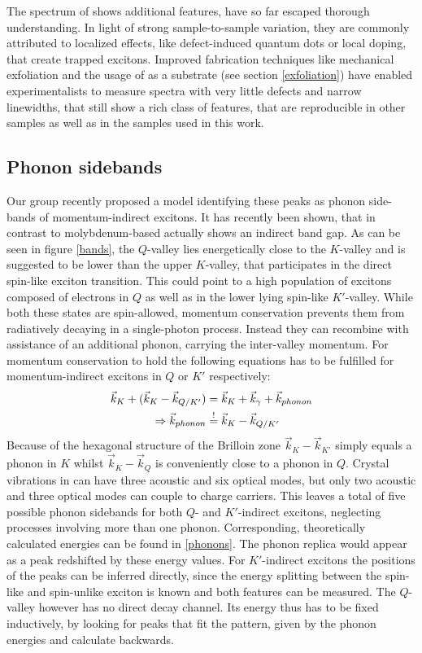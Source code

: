 The spectrum of \wse shows additional features, have so far escaped thorough understanding. In light of strong sample-to-sample variation, they are commonly attributed to localized effects, like defect-induced quantum dots or local doping\cite{kato_optical_2014, zhang_defect_2017}, that create trapped excitons. Improved fabrication techniques like mechanical exfoliation and the usage of \hbng as a substrate (see section \ref{exfoliation}) have enabled experimentalists to measure spectra with very little defects and narrow linewidths, that still show a rich class of features, that are reproducible in other samples as well as in the samples used in this work.

\subsection{Phonon sidebands}\label{sidebands}

Our group recently proposed a model identifying these peaks as phonon side-bands of momentum-indirect excitons\cite{lindlau_identifying_2017}. It has recently been shown, that in contrast to molybdenum-based \tmds \wse actually shows an indirect band gap\cite{zhang_probing_2015, hsu_evidence_2017}. As can be seen in figure \ref{bands}, the $Q$-valley lies energetically close to the $K$-valley and is suggested to be lower than the upper $K$-valley, that participates in the direct spin-like exciton transition. This could point to a high population of excitons composed of electrons in $Q$ as well as in the lower lying spin-like $K'$-valley. While both these states are spin-allowed, momentum conservation prevents them from radiatively decaying in a single-photon process. Instead they can recombine with assistance of an additional phonon, carrying the inter-valley momentum. For momentum conservation to hold the following equations has to be fulfilled for momentum-indirect excitons in $Q$ or $K'$ respectively:
\begin{align}
	\vec{k}_K + (\vec{k}_K - \vec{k}_{Q/K'}) &= \vec{k}_K + \vec{k}_\gamma + \vec{k}_{phonon}\\
	\Rightarrow \vec{k}_{phonon} &\overset{!}{=} \vec{k}_K - \vec{k}_{Q/K'}
\end{align}
Because of the hexagonal structure of the Brilloin zone $\vec{k}_K - \vec{k}_{K'}$ simply equals a phonon in $K$ whilst $\vec{k}_K - \vec{k}_{Q}$ is conveniently close to a phonon in $Q$. Crystal vibrations in \tmds can have three acoustic and six optical modes, but only two acoustic and three optical modes can couple to charge carriers. This leaves a total of five possible phonon sidebands for both $Q$- and $K'$-indirect excitons, neglecting processes involving more than one phonon. Corresponding, theoretically calculated energies can be found in \ref{phonons}\cite{jin_intrinsic_2014}. The phonon replica would appear as a peak redshifted by these energy values. For $K'$-indirect excitons the positions of the peaks can be inferred directly, since the energy splitting between the spin-like and spin-unlike exciton is known and both features can be measured. The $Q$-valley however has no direct decay channel. Its energy thus has to be fixed inductively, by looking for peaks that fit the pattern, given by the phonon energies and calculate backwards.

